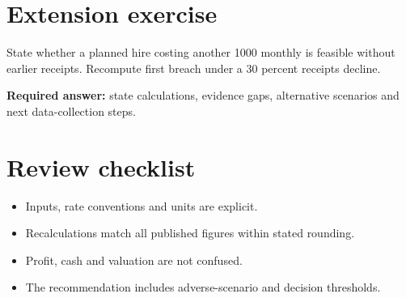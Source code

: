 \documentclass[11pt]{article}
\begin{document}
\section{Extension exercise}
State whether a planned hire costing another 1000 monthly is feasible without earlier receipts. Recompute first breach under a 30 percent receipts decline.\par\textbf{Required answer:} state calculations, evidence gaps, alternative scenarios and next data-collection steps.
\section{Review checklist}
\begin{itemize}[leftmargin=*,itemsep=3pt]
\item Inputs, rate conventions and units are explicit.
\item Recalculations match all published figures within stated rounding.
\item Profit, cash and valuation are not confused.
\item The recommendation includes adverse-scenario and decision thresholds.
\end{itemize}
\end{document}
